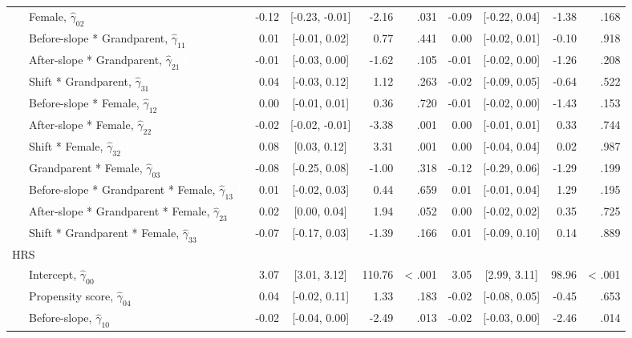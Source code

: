 \documentclass[
  english,
  man,floatsintext]{apa7}
\newenvironment{lltable}{\begin{landscape}\begin{center}\begin{ThreePartTable}}{\end{ThreePartTable}\end{center}\end{landscape}}
\begin{document}
\begin{lltable}
{\begin{longtable}{lrcrrrcrr}
\ \ \ Female, $\hat{\gamma}_{02}$ \textcolor{white}{L} & -0.12 & {}[-0.23, -0.01] & -2.16 & .031 & -0.09 & {}[-0.22, 0.04] & -1.38 & .168\\
\ \ \ Before-slope * Grandparent, $\hat{\gamma}_{11}$ \textcolor{white}{L} & 0.01 & {}[-0.01, 0.02] & 0.77 & .441 & 0.00 & {}[-0.02, 0.01] & -0.10 & .918\\
\ \ \ After-slope * Grandparent, $\hat{\gamma}_{21}$ \textcolor{white}{L} & -0.01 & {}[-0.03, 0.00] & -1.62 & .105 & -0.01 & {}[-0.02, 0.00] & -1.26 & .208\\
\ \ \ Shift * Grandparent, $\hat{\gamma}_{31}$ \textcolor{white}{L} & 0.04 & {}[-0.03, 0.12] & 1.12 & .263 & -0.02 & {}[-0.09, 0.05] & -0.64 & .522\\
\ \ \ Before-slope * Female, $\hat{\gamma}_{12}$ \textcolor{white}{L} & 0.00 & {}[-0.01, 0.01] & 0.36 & .720 & -0.01 & {}[-0.02, 0.00] & -1.43 & .153\\
\ \ \ After-slope * Female, $\hat{\gamma}_{22}$ \textcolor{white}{L} & -0.02 & {}[-0.02, -0.01] & -3.38 & .001 & 0.00 & {}[-0.01, 0.01] & 0.33 & .744\\
\ \ \ Shift * Female, $\hat{\gamma}_{32}$ \textcolor{white}{L} & 0.08 & {}[0.03, 0.12] & 3.31 & .001 & 0.00 & {}[-0.04, 0.04] & 0.02 & .987\\
\ \ \ Grandparent * Female, $\hat{\gamma}_{03}$ \textcolor{white}{L} & -0.08 & {}[-0.25, 0.08] & -1.00 & .318 & -0.12 & {}[-0.29, 0.06] & -1.29 & .199\\
\ \ \ Before-slope * Grandparent * Female, $\hat{\gamma}_{13}$ \textcolor{white}{L} & 0.01 & {}[-0.02, 0.03] & 0.44 & .659 & 0.01 & {}[-0.01, 0.04] & 1.29 & .195\\
\ \ \ After-slope * Grandparent * Female, $\hat{\gamma}_{23}$ \textcolor{white}{L} & 0.02 & {}[0.00, 0.04] & 1.94 & .052 & 0.00 & {}[-0.02, 0.02] & 0.35 & .725\\
\ \ \ Shift * Grandparent * Female, $\hat{\gamma}_{33}$ \textcolor{white}{L} & -0.07 & {}[-0.17, 0.03] & -1.39 & .166 & 0.01 & {}[-0.09, 0.10] & 0.14 & .889\\
HRS &  &  &  &  &  &  &  & \\
\ \ \ Intercept, $\hat{\gamma}_{00}$ \textcolor{white}{H} & 3.07 & {}[3.01, 3.12] & 110.76 & < .001 & 3.05 & {}[2.99, 3.11] & 98.96 & < .001\\
\ \ \ Propensity score, $\hat{\gamma}_{04}$ \textcolor{white}{H} & 0.04 & {}[-0.02, 0.11] & 1.33 & .183 & -0.02 & {}[-0.08, 0.05] & -0.45 & .653\\
\ \ \ Before-slope, $\hat{\gamma}_{10}$ \textcolor{white}{H} & -0.02 & {}[-0.04, 0.00] & -2.49 & .013 & -0.02 & {}[-0.03, 0.00] & -2.46 & .014\\

\end{longtable}}
\end{lltable}
\end{document}
